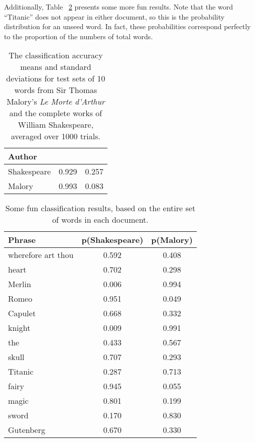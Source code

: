 \documentclass{journal}
\begin{document}
Additionally, Table ~\ref{tab:fun} presents some more fun results.
Note that the word ``Titanic'' does
not appear in either document, so this is the probability distribution
for an unseed word. In
fact, these probabilities correspond perfectly
to the proportion of the numbers of total words.

\begin{table}[h]
\centering{}
\caption{The classification accuracy means and standard deviations
for test sets of 10 words from Sir Thomas
Malory's \emph{Le Morte d'Arthur} and the complete works of William Shakespeare,
averaged over 1000 trials.}\label{tab:systematic}
\begin{tabular}{lcc}
    Author & \mu{} & \sigma{} \\ \toprule
    Shakespeare & 0.929 & 0.257 \\
    Malory & 0.993 & 0.083
\end{tabular}
\end{table}

\begin{table}[h]
\centering{}
\caption{Some fun classification results, based on the entire set of words in
each document.}\label{tab:fun}
\begin{tabular}{lcc}
    Phrase & p(Shakespeare) & p(Malory) \\ \toprule
    wherefore art thou & 0.592 & 0.408 \\
    heart & 0.702 & 0.298 \\
    Merlin & 0.006 & 0.994 \\
    Romeo & 0.951 & 0.049 \\
    Capulet & 0.668 & 0.332 \\
    knight & 0.009 & 0.991 \\
    the & 0.433 & 0.567 \\
    skull & 0.707 & 0.293 \\
    Titanic & 0.287 & 0.713 \\
    fairy & 0.945 & 0.055 \\
    magic & 0.801 & 0.199 \\
    sword & 0.170 & 0.830 \\
    Gutenberg & 0.670 & 0.330
\end{tabular}
\end{table}
\end{document}

